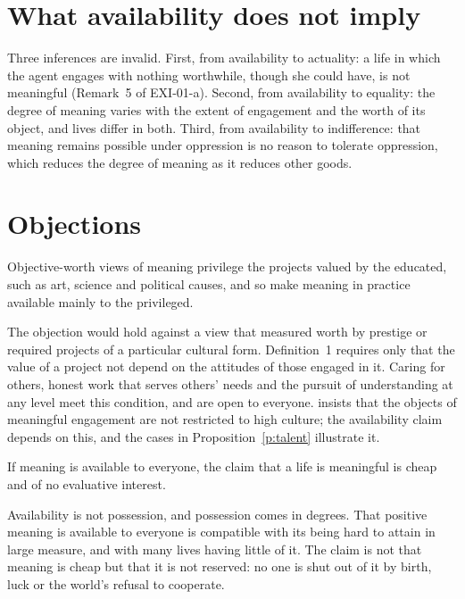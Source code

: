 \documentclass{situationist-preprint}
\begin{document}
\section{What availability does not imply}

Three inferences are invalid. First, from availability to actuality: a life in which the agent engages with nothing worthwhile, though she could have, is not meaningful (Remark~5 of EXI-01-a). Second, from availability to equality: the degree of meaning varies with the extent of engagement and the worth of its object, and lives differ in both. Third, from availability to indifference: that meaning remains possible under oppression is no reason to tolerate oppression, which reduces the degree of meaning as it reduces other goods.

\section{Objections}

\begin{objection}[Elitism]
Objective-worth views of meaning privilege the projects valued by the educated, such as art, science and political causes, and so make meaning in practice available mainly to the privileged.
\end{objection}

\begin{reply}
The objection would hold against a view that measured worth by prestige or required projects of a particular cultural form. Definition~1 requires only that the value of a project not depend on the attitudes of those engaged in it. Caring for others, honest work that serves others' needs and the pursuit of understanding at any level meet this condition, and are open to everyone. \citet{Wolf2010} insists that the objects of meaningful engagement are not restricted to high culture; the availability claim depends on this, and the cases in Proposition~\ref{p:talent} illustrate it.
\end{reply}

\begin{objection}[Triviality]
If meaning is available to everyone, the claim that a life is meaningful is cheap and of no evaluative interest.
\end{objection}

\begin{reply}
Availability is not possession, and possession comes in degrees. That positive meaning is available to everyone is compatible with its being hard to attain in large measure, and with many lives having little of it. The claim is not that meaning is cheap but that it is not reserved: no one is shut out of it by birth, luck or the world's refusal to cooperate.
\end{reply}
\end{document}
